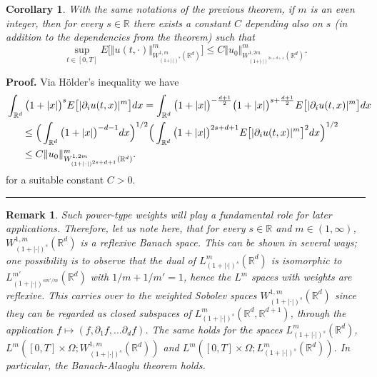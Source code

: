 \documentclass[a4paper,10pt]{article}
\newtheorem{corollary}[theorem]{Corollary}
\newtheorem{remark}[theorem]{Remark}
\newenvironment{proof}[1][Proof]{\noindent\textbf{#1.} }{\ \rule{0.5em}{0.5em}}
\newcommand{\mr}{\mathbb{R}}
\begin{document}
\begin{corollary}
\label{Corollary a priori estimate}With the same notations of the previous
theorem, if $m$ is an even integer, then for every $s\in\mathbb{R}$ there exists a
constant $C$ depending also on $s$ (in addition to the dependencies from the theorem)
such that
\begin{equation*}
\sup_{t\in [0,T]}E \Big[ \Vert u(t,\cdot)\Vert_{W_{(1+\vert \cdot \vert)^{s}}^{1,m}(
\mathbb{R}^{d})}^{m} \Big] \leq C \Vert u_{0} \Vert_{W_{(1+\vert \cdot \vert)^{2s+d+1}}^{1,2m}(\mathbb{R}^{d})}^{m}.
\end{equation*}
\end{corollary}

\begin{proof}
Via H\"older's inequality we have
\begin{align*}
\lefteqn{ \hspace{-0.5cm} \int_{\mathbb{R}^{d}} \big(1+\vert x \vert \big)^{s} E\big[ \vert \partial_{i} u(t,x) \vert^{m}\big] dx 
=\int_{\mathbb{R}^{d}} \big(1+\vert x \vert \big)^{-\frac{d+1}{2}} \big(1+\vert x\vert \big)^{s+\frac{d+1}{2}} E\big[ \vert \partial_{i}u(t,x) \vert^{m}\big]  dx } \\
&  \leq \Big( \int_{\mathbb{R}^{d}} \big(1+\vert x \vert \big)^{-d-1}dx \Big)^{1/2} \Big( \int_{\mathbb{R}^{d}} \big(1+ \vert x \vert \big)^{2s+ d+1} E\big[ \vert \partial_{i}u(t,x) \vert^{m} \big]^{2} dx \Big)^{1/2}\\
&  \leq C \Vert u_{0} \Vert_{W_{(1+\vert \cdot \vert )^{2s+d+1}}^{1,2m}(\mathbb{R}^{d})}^{m}.
\end{align*}
for a suitable constant $C>0$.
\end{proof}

\begin{remark}
\label{rem_weihted_spaces_reflexive}
Such power-type weights will play a fundamental role for later applications. Therefore, let us note here, that for every $s \in \mr$ and $m \in (1,\infty)$, $W^{1,m}_{(1+|\cdot|)^s}(\mr^d)$ is a reflexive Banach space. This can be shown in several ways; one possibility is to observe that the dual of $L^m_{(1+|\cdot|)^s}(\mr^d)$ is isomorphic to $L^{m'}_{(1+|\cdot|)^{sm'/m}}(\mr^d)$ with $1/m + 1/m' = 1$, hence the $L^m$ spaces with weights are reflexive. This carries over to the weighted Sobolev spaces $W^{1,m}_{(1+|\cdot|)^s}(\mr^d)$ since they can be regarded as closed subspaces of $L^m_{(1+|\cdot|)^s}(\mr^d,\mr^{d+1})$, through the application $f\mapsto(f,\partial_1f,\ldots\partial_df)$. The same holds for the spaces $L^m_{(1+|\cdot|)^s}(\mr^d)$, $L^m([0,T]\times\Omega;W^{1,m}_{(1+|\cdot|)^s}(\mr^d))$ and $L^m([0,T]\times\Omega;L^m_{(1+|\cdot|)^s}(\mr^d))$. In particular, the Banach-Alaoglu theorem holds.
\end{remark}
\end{document}
